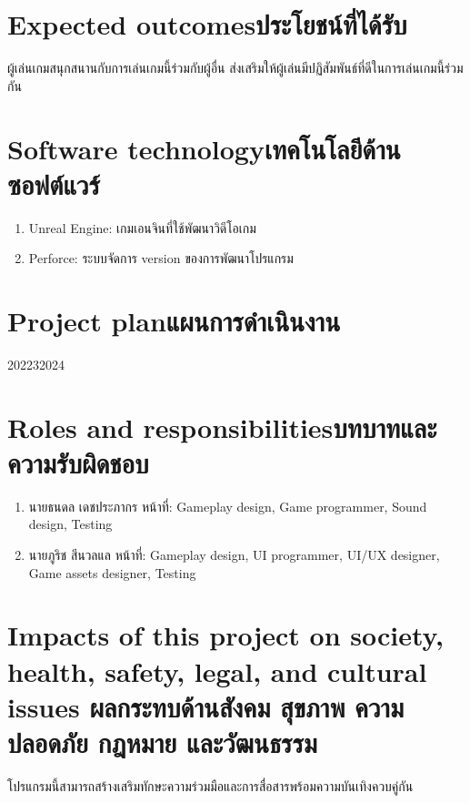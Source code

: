 \section{\ifenglish Expected outcomes\else ประโยชน์ที่ได้รับ\fi}

ผู้เล่นเกมสนุกสนานกับการเล่นเกมนี้ร่วมกับผู้อื่น ส่งเสริมให้ผู้เล่นมีปฏิสัมพันธ์ที่ดีในการเล่นเกมนี้ร่วมกัน

\section{\ifenglish Software technology\else เทคโนโลยีด้านซอฟต์แวร์\fi}
\begin{enumerate}
    \item Unreal Engine: เกมเอนจินที่ใช้พัฒนาวิดีโอเกม
    \item Perforce: ระบบจัดการ version ของการพัฒนาโปรแกรม
\end{enumerate}

\section{\ifenglish Project plan\else แผนการดำเนินงาน\fi}

\begin{plan}{12}{2022}{3}{2024}
\end{plan}

\section{\ifenglish Roles and responsibilities\else บทบาทและความรับผิดชอบ\fi}
\begin{enumerate}
    \item นายธนดล เดชประภากร หน้าที่: Gameplay design, Game programmer, Sound design, Testing
    \item นายภูริช สีนวลแล หน้าที่: Gameplay design, UI programmer, UI/UX designer, Game assets designer, Testing
\end{enumerate}

\section{\ifenglish%
Impacts of this project on society, health, safety, legal, and cultural issues
\else%
ผลกระทบด้านสังคม สุขภาพ ความปลอดภัย กฎหมาย และวัฒนธรรม
\fi}

โปรแกรมนี้สามารถสร้างเสริมทักษะความร่วมมือและการสื่อสารพร้อมความบันเทิงควบคู่กัน
